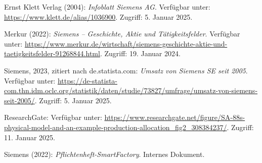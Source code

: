 
\begin{thebibliography}{}

Ernst Klett Verlag (2004): \textit{Infoblatt Siemens AG}. Verfügbar unter: \url{https://www.klett.de/alias/1036900}. Zugriff: 5. Januar 2025.

Merkur (2022): \textit{Siemens – Geschichte, Aktie und Tätigkeitsfelder}. Verfügbar unter: \url{https://www.merkur.de/wirtschaft/siemens-geschichte-aktie-und-taetigkeitsfelder-91268844.html}. Zugriff: 19. Januar 2024.

Siemens, 2023, zitiert nach de.statista.com: \textit{Umsatz von Siemens SE seit 2005}. Verfügbar unter: \url{https://de-statista-com.thn.idm.oclc.org/statistik/daten/studie/73827/umfrage/umsatz-von-siemens-seit-2005/}. Zugriff: 5. Januar 2025.

ResearchGate: Verfügbar unter: \url{https://www.researchgate.net/figure/SA-88s-physical-model-and-an-example-production-allocation_fig2_308384237/}. Zugriff: 11. Januar 2025.

Siemens (2022): \textit{Pflichtenheft-SmartFactory}. Internes Dokument.

\end{thebibliography}
